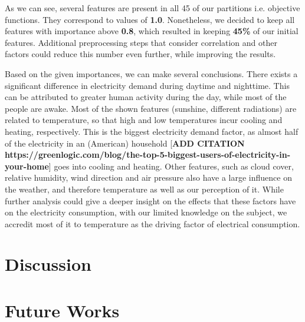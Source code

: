 \documentclass[12pt]{article}
\begin{document}
As we can see, several features are present in all 45 of our partitions i.e. objective functions. They correspond to values of \textbf{1.0}. Nonetheless, we decided to keep all features with importance above \textbf{0.8}, which resulted in keeping \textbf{45\%} of our initial features. Additional preprocessing steps that consider correlation and other factors could reduce this number even further, while improving the results.

Based on the given importances, we can make several conclusions. There exists a significant difference in electricity demand during daytime and nighttime. This can be attributed to greater human activity during the day, while most of the people are awake. Most of the shown features (sunshine, different radiations) are related to temperature, so that high and low temperatures incur cooling and heating, respectively. This is the biggest electricity demand factor, as almost half of the electricity in an (American) household [\textbf{ADD CITATION https://greenlogic.com/blog/the-top-5-biggest-users-of-electricity-in-your-home}] goes into cooling and heating. Other features, such as cloud cover, relative humidity, wind direction and air pressure also have a large influence on the weather, and therefore temperature as well as our perception of it. While further analysis could give a deeper insight on the effects that these factors have on the electricity consumption, with our limited knowledge on the subject, we accredit most of it to temperature as the driving factor of electrical consumption.

\section{Discussion}

\section{Future Works}

\printbibliography
\end{document}
